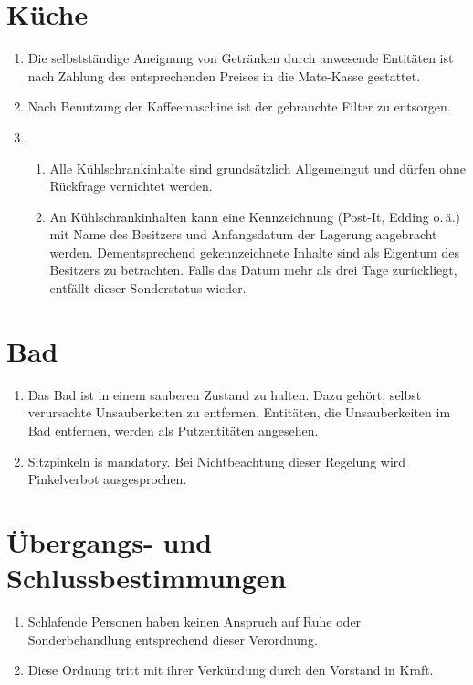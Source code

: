 \documentclass[12pt,a4paper]{scrartcl}
\begin{document}
\section{Küche}
\begin{enumerate}
  \item Die selbstständige Aneignung von Getränken durch anwesende Entitäten ist
    nach Zahlung des entsprechenden Preises in die Mate-Kasse gestattet.
  \item Nach Benutzung der Kaffeemaschine ist der gebrauchte Filter zu
    entsorgen.
  \item\begin{enumerate}
    \item Alle Kühlschrankinhalte sind grundsätzlich Allgemeingut und dürfen
      ohne Rückfrage vernichtet werden.
    \item An Kühlschrankinhalten kann eine Kennzeichnung (Post-It, Edding
      o.\,ä.) mit Name des Besitzers und Anfangsdatum der Lagerung
      angebracht werden. Dementsprechend gekennzeichnete Inhalte sind als
      Eigentum des Besitzers zu betrachten. Falls das Datum mehr als drei Tage
      zurückliegt, entfällt dieser Sonderstatus wieder.
  \end{enumerate}
\end{enumerate}

\section{Bad}
\begin{enumerate}
  \item Das Bad ist in einem sauberen Zustand zu halten. Dazu gehört, selbst
    verursachte Unsauberkeiten zu entfernen. Entitäten, die Unsauberkeiten im
    Bad entfernen, werden als Putzentitäten angesehen.

  \item Sitzpinkeln is mandatory. Bei Nichtbeachtung dieser Regelung wird
    Pinkelverbot ausgesprochen.
\end{enumerate}

\section{Übergangs- und Schlussbestimmungen}
\begin{enumerate}
  \item Schlafende Personen haben keinen Anspruch auf Ruhe oder Sonderbehandlung
    entsprechend dieser Verordnung.

  \item Diese Ordnung tritt mit ihrer Verkündung durch den Vorstand in Kraft.
\end{enumerate}
\end{document}

